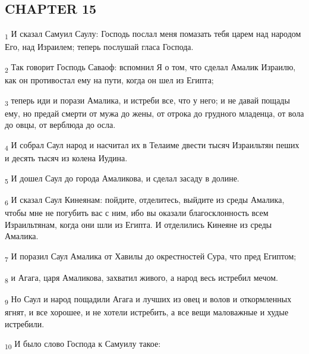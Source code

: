 \subsection{CHAPTER 15}
\begin{tcolorbox}
\textsubscript{1} И сказал Самуил Саулу: Господь послал меня помазать тебя царем над народом Его, над Израилем; теперь послушай гласа Господа.
\end{tcolorbox}
\begin{tcolorbox}
\textsubscript{2} Так говорит Господь Саваоф: вспомнил Я о том, что сделал Амалик Израилю, как он противостал ему на пути, когда он шел из Египта;
\end{tcolorbox}
\begin{tcolorbox}
\textsubscript{3} теперь иди и порази Амалика, и истреби все, что у него; и не давай пощады ему, но предай смерти от мужа до жены, от отрока до грудного младенца, от вола до овцы, от верблюда до осла.
\end{tcolorbox}
\begin{tcolorbox}
\textsubscript{4} И собрал Саул народ и насчитал их в Телаиме двести тысяч Израильтян пеших и десять тысяч из колена Иудина.
\end{tcolorbox}
\begin{tcolorbox}
\textsubscript{5} И дошел Саул до города Амаликова, и сделал засаду в долине.
\end{tcolorbox}
\begin{tcolorbox}
\textsubscript{6} И сказал Саул Кинеянам: пойдите, отделитесь, выйдите из среды Амалика, чтобы мне не погубить вас с ним, ибо вы оказали благосклонность всем Израильтянам, когда они шли из Египта. И отделились Кинеяне из среды Амалика.
\end{tcolorbox}
\begin{tcolorbox}
\textsubscript{7} И поразил Саул Амалика от Хавилы до окрестностей Сура, что пред Египтом;
\end{tcolorbox}
\begin{tcolorbox}
\textsubscript{8} и Агага, царя Амаликова, захватил живого, а народ весь истребил мечом.
\end{tcolorbox}
\begin{tcolorbox}
\textsubscript{9} Но Саул и народ пощадили Агага и лучших из овец и волов и откормленных ягнят, и все хорошее, и не хотели истребить, а все вещи маловажные и худые истребили.
\end{tcolorbox}
\begin{tcolorbox}
\textsubscript{10} И было слово Господа к Самуилу такое:
\end{tcolorbox}
